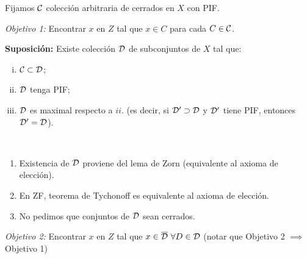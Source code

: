 Fijamos $\mathcal{C}$ colección arbitraria de cerrados en $X$ con PIF.\par
\textit{Objetivo 1:} Encontrar $x$ en $Z$ tal que $x \in C$ para cada $C \in \mathcal{C}$.\par
\noindent \textbf{Suposición:} Existe colección $\mathcal{D}$ de subconjuntos de $X$ tal que:
\begin{enumerate}[i.]
	\item $\mathcal{C} \subset \mathcal{D}$;

	\item $\mathcal{D}$ tenga PIF;

	\item $\mathcal{D}$ es maximal respecto a $ii.$ (es decir, si $\mathcal{D}' \supset \mathcal{D}$ y $\mathcal{D}'$ tiene PIF, entonces $\mathcal{D}' = \mathcal{D}$).
\end{enumerate}
\begin{remark}~
	\begin{enumerate}
		\item Existencia de $\mathcal{D}$ proviene del lema de Zorn (equivalente al axioma de elección).

		\item En ZF, teorema de Tychonoff es equivalente al axioma de elección.

		\item No pedimos que conjuntos de $\mathcal{D}$ sean cerrados.
	\end{enumerate}
\end{remark}
\par
\textit{Objetivo 2:} Encontrar $x$ en $Z$ tal que $x \in \overline{\mathcal{D}} \ \forall D \in \mathcal{D}$ (notar que Objetivo 2 $\implies$ Objetivo 1)\par

